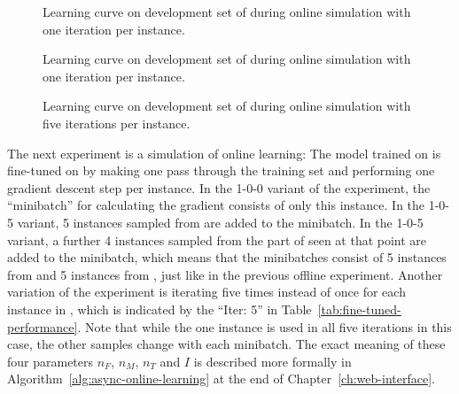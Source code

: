 \begin{figure}[p]
  \centering
  \resizebox{0.9\textwidth}{!}{}
  \caption[1-iter learning curve on \nlmfour{}]{Learning curve on development
    set of \nlmapsfour{} during online simulation with one iteration per
    instance.}
  \label{fig:online-1-v4-learning-curve}
\end{figure}

\begin{figure}[p]
  \centering
  \resizebox{0.9\textwidth}{!}{}
  \caption[1-iter learning curve on \nlmthree{}]{Learning curve on development
    set of \nlmapsthree{} during online simulation with one iteration per
    instance.}
  \label{fig:online-1-v3-learning-curve}
\end{figure}

\begin{figure}[h]
  \centering
  \resizebox{\textwidth}{!}{}
  \caption[5-Iter learning curve on \nlmfour{}]{Learning curve on development
    set of \nlmapsfour{} during online simulation with five iterations per
    instance.}
  \label{fig:online-5-v4-learning-curve}
\end{figure}

The next experiment is a simulation of online learning: The model trained on
\nlmapsthree{} is fine-tuned on \nlmapsfour{} by making one pass through the
\nlmfour{} training set and performing one gradient descent step per instance.
In the 1-0-0 variant of the experiment, the \enquote{minibatch} for calculating
the gradient consists of only this instance. In the 1-0-5 variant, 5 instances
sampled from \nlmapsthree{} are added to the minibatch. In the 1-0-5 variant, a
further 4 instances sampled from the part of \nlmfour{} seen at that point are
added to the minibatch, which means that the minibatches consist of 5 instances
from \nlmthree{} and 5 instances from \nlmfour{}, just like in the previous
offline experiment. Another variation of the experiment is iterating five times
instead of once for each instance in \nlmfour{}, which is indicated by the
\enquote{Iter: 5} in Table~\ref{tab:fine-tuned-performance}. Note that while the
one instance is used in all five iterations in this case, the other samples
change with each minibatch. The exact meaning of these four parameters \(n_F\),
\(n_M\), \(n_T\) and \(I\) is described more formally in
Algorithm~\ref{alg:async-online-learning} at the end of
Chapter~\ref{ch:web-interface}.

